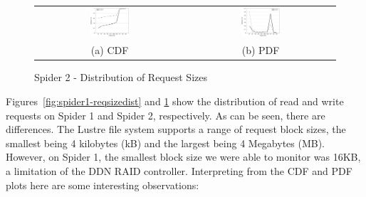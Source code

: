 \begin{figure}[!t]
\begin{center}
\begin{tabular}{cc}
\hspace*{-1cm}                                                           
{\includegraphics[width=0.27\textwidth]{./figs/spider2-reqSizeCDF.eps}}&
\hspace{-2mm}
{\includegraphics[width=0.27\textwidth]{./figs/spider2-reqSizePDF.eps}}\\
\small (a) CDF & \small(b) PDF \\
\end{tabular}
\vspace{-0.1in}
\caption{Spider 2 - Distribution of Request Sizes}
\label{fig:spider2-reqsizedist}
\end{center}
\end{figure}

Figures~\ref{fig:spider1-reqsizedist} and \ref{fig:spider2-reqsizedist}
show the distribution of read and write requests on Spider 1 and Spider 2,
respectively. As can be seen, there are differences. The Lustre file system
supports a range of request block sizes, the smallest being 4 kilobytes (kB)
and the largest being 4 Megabytes (MB).  However, on Spider 1, the smallest
block size we were able to monitor was 16KB, a limitation of the DDN RAID
controller. Interpreting from the CDF and PDF plots here are some interesting
observations:


